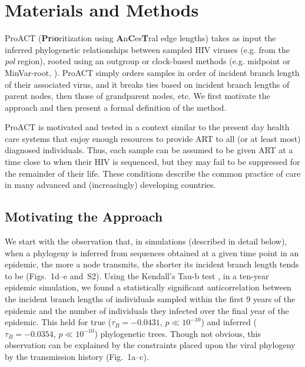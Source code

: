 \documentclass[oupdraft]{sysbio}
\newcommand{\PLWH}{sample\xspace}
\begin{document}
\section{Materials and Methods}
ProACT (\textbf{Pr}i\textbf{o}ritization using \textbf{A}n\textbf{C}es\textbf{T}ral edge lengths) takes as input the inferred phylogenetic relationships between sampled HIV viruses (e.g. from the \textit{pol} region), rooted using an outgroup or clock-based methods (e.g. midpoint or MinVar-root, \citet{Mai2017}). 
ProACT simply orders \PLWH{s} in order of incident branch length of their associated virus, and it breaks ties based on incident branch lengths of parent nodes, then those of grandparent nodes, etc.
We first motivate the approach and then present a formal definition of the method.

ProACT is motivated and tested in a context similar to the present day health care systems that enjoy enough resources to provide ART to all (or at least most) diagnosed individuals.
Thus, each \PLWH can be assumed to be given ART at a time close to when their HIV is sequenced, but they may fail to be suppressed for the remainder of their life.
These conditions describe the common practice of care in many advanced and (increasingly) developing countries. 


\subsection{Motivating the Approach}

We start with the observation that, in simulations (described in detail below),
when a phylogeny is inferred from sequences obtained at a given time point in an epidemic,
the more a node transmits, the shorter its incident branch length tends to be
(Figs.~1d--e and~S2).
Using the Kendall's Tau-b test \citep{Kendall1938}, in a ten-year epidemic simulation, we found a statistically significant anticorrelation between the incident branch lengths of individuals sampled within the first 9 years of the epidemic and the number of individuals they infected over the final year of the epidemic. This held for true ($\tau_B=-0.0431$, $p\ll 10^{-10}$) and inferred ($\tau_B=-0.0354$, $p\ll 10^{-10}$) phylogenetic trees.
Though not obvious, this observation can be explained by the constraints placed upon the viral phylogeny by the transmission history (Fig.~1a--c).
\end{document}
